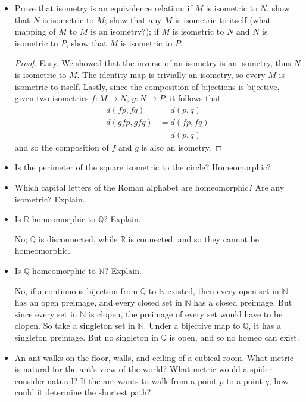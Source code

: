 \documentclass[11pt,a4paper]{article}
\newcommand{\pnum}[1]{\item[\textbf{#1}]}
\newcommand{\N}{\mathbb{N}}
\newcommand{\Q}{\mathbb{Q}}
\newcommand{\R}{\mathbb{R}}
\begin{document}
\begin{itemize}
	\pnum{2.19} Prove that isometry is an equivalence relation: if $M$ is isometric to $N$, show that $N$
	is isometric to $M$; show that any $M$ is isometric to itself (what mapping of $M$ to $M$ is an
	isometry?); if $M$ is isometric to $N$ and $N$ is isometric to $P$, show that $M$ is isometric to $P$.
	
	\begin{proof}
		Easy. We showed that the inverse of an isometry is an isometry, thus $N$ is isometric to $M$.
		The identity map is trivially an isometry, so every $M$ is isometric to itself. Lastly, since
		the composition of bijections is bijective, given two isometries $f : M \to N$, $g : N \to P$,
		it follows that
		\begin{align}
			d(fp, fq) &= d(p,q) \\
			d(gfp, gfq) &= d(fp, fq) \\
									&= d(p,q)
		\end{align}
		and so the composition of $f$ and $g$ is also an isometry.
	\end{proof}

	\pnum{\hl{2.20}} Is the perimeter of the square isometric to the circle? Homeomorphic?

	\pnum{\hl{2.21}} Which capital letters of the Roman alphabet are homeomorphic? Are any isometric?
	Explain.

	\pnum{2.22} Is $\R$ homeomorphic to $\Q$? Explain.

	No; $\Q$ is disconnected, while $\R$ is connected, and so they cannot be homeomorphic.

	\pnum{2.23} Is $\Q$ homeomorphic to $\N$? Explain.

	No, if a continuous bijection from $\Q$ to $\N$ existed, then every open set in $\N$ has an open
	preimage, and every closed set in $\N$ has a closed preimage. But since every set in $\N$ is clopen,
	the preimage of every set would have to be clopen. So take a singleton set in $\N$. Under a bijective
	map to $\Q$, it has a singleton preimage. But no singleton in $\Q$ is open, and so no homeo can exist.

	\pnum{\hl{2.24}} An ant walks on the floor, walls, and ceiling of a cubical room. What metric is
	natural	for the ant's view of the world? What metric would a spider consider natural? If the ant wants
	to walk	from a point $p$ to a point $q$, how could it determine the shortest path?


\end{itemize}
\end{document}
